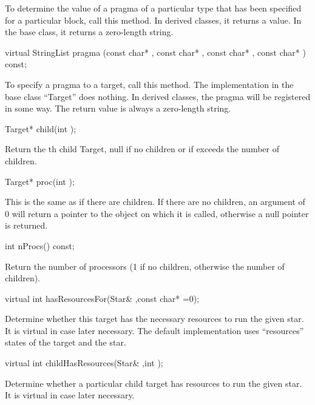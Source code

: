 To determine the value of a pragma of a particular type
that has been specified for a particular block, call this
method. In derived classes, it returns a value.
In the base class, it returns a zero-length string.

\begin{example}
virtual StringList pragma (const char* ,
	const char* ,
	const char* ,
	const char* ) const;
\end{example}

To specify a pragma to a target, call this method.
The implementation in the base class ``Target'' does nothing.
In derived classes, the pragma will be registered in some way.
The return value is always a zero-length string.

\begin{example}
Target* child(int );
\end{example}

Return the th child Target, null if no children or if
 exceeds the number of children.

\begin{example}
Target* proc(int );
\end{example}

This is the same as  if there are children.  If
there are no children, an argument of 0 will return a pointer
to the object on which it is called, otherwise a null pointer
is returned.

\begin{example}
int nProcs() const;
\end{example}

Return the number of processors (1 if no children, otherwise the
number of children).

\begin{example}
virtual int hasResourcesFor(Star& ,const char* =0);
\end{example}

Determine whether this target has the necessary resources to run the
given star.  It is virtual in case later necessary.  The default implementation
uses ``resources'' states of the target and the star.

\begin{example}
virtual int childHasResources(Star& ,int );
\end{example}

Determine whether a particular child target has resources
to run the given star.  It is virtual in case later necessary.

